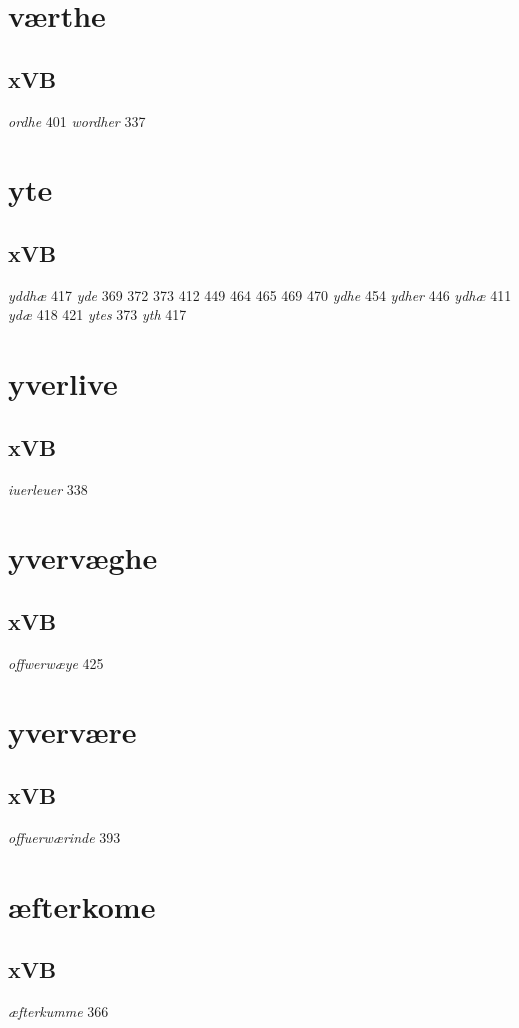 \documentclass[a4paper,twocolumn]{article}
\begin{document}
\section{værthe}
\label{sec:org3e2288d}
\subsection{xVB}
\label{sec:org6a03c6f}
\emph{ordhe} 401 \emph{wordher} 337 
\section{yte}
\label{sec:org1f4ff09}
\subsection{xVB}
\label{sec:org2218a58}
\emph{yddhæ} 417 \emph{yde} 369 372 373 412 449 464 465 469 470 \emph{ydhe} 454 \emph{ydher} 446 \emph{ydhæ} 411 \emph{ydæ} 418 421 \emph{ytes} 373 \emph{yth} 417 
\section{yverlive}
\label{sec:org10bcc93}
\subsection{xVB}
\label{sec:org3edaada}
\emph{iuerleuer} 338 
\section{yvervæghe}
\label{sec:org818fc01}
\subsection{xVB}
\label{sec:org45a7305}
\emph{offwerwæye} 425 
\section{yvervære}
\label{sec:org35559ec}
\subsection{xVB}
\label{sec:orga13e080}
\emph{offuerwærinde} 393 
\section{æfterkome}
\label{sec:org539f29e}
\subsection{xVB}
\label{sec:orgef9f7c9}
\emph{æfterkumme} 366 
\end{document}

